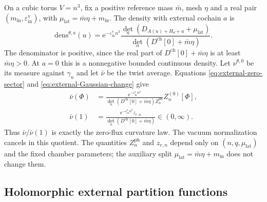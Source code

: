 \documentclass[11pt,letterpaper,reqno]{amsart}
\begin{document}
On a cubic torus $V=n^3$, fix a positive reference mass
$\bar m$, mesh $\eta$ and a real pair
$(m_{\mathrm{in}},\varepsilon_{\mathrm{in}}^{\mathrm v})$,
with $\mu_{\mathrm{lat}}=\bar m\eta+m_{\mathrm{in}}$.
The density with external cochain $a$ is
\begin{equation}\label{eq:external-matter-density}
 \mathrm{dens}^{\theta,a}(u)=
 \mathrm e^{-\varepsilon_{\mathrm{in}}^{\mathrm v}n^3}
 \frac{\det_n(D_{A(u)+H_\theta+a}+\mu_{\mathrm{lat}})}
                       {\det_n(D^{\mathrm{ch}}[0]+\bar m\eta)}.
\end{equation}
The denominator is positive, since the real part
of $D^{\mathrm{ch}}[0]+\bar m\eta$ is at least $\bar m\eta>0$.
At $a=0$ this is a nonnegative bounded continuous
density. Let $\nu^{\theta,0}$ be its measure against
$\gamma_n$ and let $\bar\nu$ be the twist average.
Equations \eqref{eq:external-zero-sector} and
\eqref{eq:external-Gaussian-change} give
\begin{align}
 \bar\nu(\Phi)
   &=\frac{\mathrm e^{-\varepsilon_{\mathrm{in}}^{\mathrm v}n^3}}
        {\det_n(D^{\mathrm{ch}}[0]+\bar m\eta)Z_n^{\mathrm{ph}}}
                                      Z_n^{(0)}[\Phi],
                                  \label{eq:external-density-zero-sector}\\
 \bar\nu(1)
   &=\frac{\mathrm e^{-\varepsilon_{\mathrm{in}}^{\mathrm v}n^3}
                                   z_{r,n}}
                       {\det_n(D^{\mathrm{ch}}[0]+\bar m\eta)}
                                  \in(0,\infty).
                                  \label{eq:external-density-normalization}
\end{align}
Thus $\bar\nu/\bar\nu(1)$ is exactly the zero-flux
curvature law. The vacuum normalization cancels in
this quotient. The quantities $Z_n^{\mathrm{ph}}$
and $z_{r,n}$ depend only on $(n,q,\mu_{\mathrm{lat}})$
and the fixed chamber parameters; the auxiliary
split $\mu_{\mathrm{lat}}=\bar m\eta+m_{\mathrm{in}}$
does not change them.

\subsection{Holomorphic external partition functions}
\label{subsec:external-holomorphy}
\end{document}
